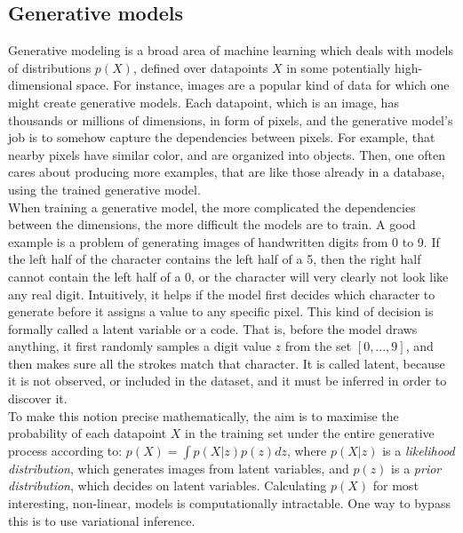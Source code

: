 \subsection{Generative models} \label{Sec.ModelLearning}

Generative modeling is a broad area of machine learning which deals with models of distributions $p(X)$, defined over datapoints $X$ in some potentially high-dimensional space. For instance, images are a popular kind of data for which one might create generative models. Each datapoint, which is an image, has thousands or millions of dimensions, in form of pixels, and the generative model’s job is to somehow capture the dependencies between pixels. For example, that nearby pixels have similar color, and are organized into objects. Then, one often cares about producing more examples, that are like those already in a database, using the trained generative model. \\
When training a generative model, the more complicated the dependencies between the dimensions, the more difficult the models are to train. A good example is a problem of generating images of handwritten digits from 0 to 9. If the left half of the character contains the left half of a 5, then the right half cannot contain the left half of a 0, or the character will very clearly not look like any real digit. Intuitively, it helps if the model first decides which character to generate before it assigns a value to any specific pixel. This kind of decision is formally called a latent variable or a code. That is, before the model draws anything, it first randomly samples a digit value $z$ from the set $[0, ..., 9]$, and then makes sure all the strokes match that character. It is called latent, because it is not observed, or included in the dataset, and it must be inferred in order to discover it. \\
To make this notion precise mathematically, the aim is to maximise the probability of each datapoint $X$ in the training set under the entire generative process according to: $p(X) = \int p(X|z)p(z)dz$, where $p(X|z)$ is a \textit{likelihood distribution}, which generates images from latent variables, and $p(z)$ is a \textit{prior distribution}, which decides on latent variables. Calculating $p(X)$ for most interesting, non-linear, models is computationally intractable. One way to bypass this is to use variational inference.

